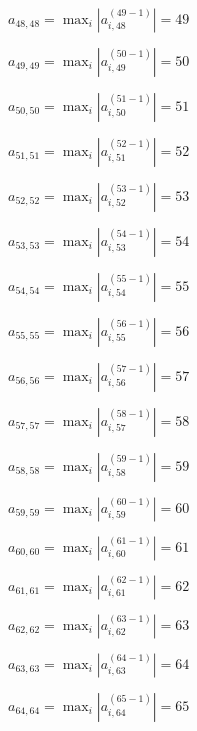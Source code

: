 \documentclass[a4paper,12pt]{article}
\begin{document}
$a _{ 48, 48 } =  \max _i |a _{ i, 48 } ^{ (49 - 1) } | = 49$

$a _{ 49, 49 } =  \max _i |a _{ i, 49 } ^{ (50 - 1) } | = 50$

$a _{ 50, 50 } =  \max _i |a _{ i, 50 } ^{ (51 - 1) } | = 51$

$a _{ 51, 51 } =  \max _i |a _{ i, 51 } ^{ (52 - 1) } | = 52$

$a _{ 52, 52 } =  \max _i |a _{ i, 52 } ^{ (53 - 1) } | = 53$

$a _{ 53, 53 } =  \max _i |a _{ i, 53 } ^{ (54 - 1) } | = 54$

$a _{ 54, 54 } =  \max _i |a _{ i, 54 } ^{ (55 - 1) } | = 55$

$a _{ 55, 55 } =  \max _i |a _{ i, 55 } ^{ (56 - 1) } | = 56$

$a _{ 56, 56 } =  \max _i |a _{ i, 56 } ^{ (57 - 1) } | = 57$

$a _{ 57, 57 } =  \max _i |a _{ i, 57 } ^{ (58 - 1) } | = 58$

$a _{ 58, 58 } =  \max _i |a _{ i, 58 } ^{ (59 - 1) } | = 59$

$a _{ 59, 59 } =  \max _i |a _{ i, 59 } ^{ (60 - 1) } | = 60$

$a _{ 60, 60 } =  \max _i |a _{ i, 60 } ^{ (61 - 1) } | = 61$

$a _{ 61, 61 } =  \max _i |a _{ i, 61 } ^{ (62 - 1) } | = 62$

$a _{ 62, 62 } =  \max _i |a _{ i, 62 } ^{ (63 - 1) } | = 63$

$a _{ 63, 63 } =  \max _i |a _{ i, 63 } ^{ (64 - 1) } | = 64$

$a _{ 64, 64 } =  \max _i |a _{ i, 64 } ^{ (65 - 1) } | = 65$
\end{document}
